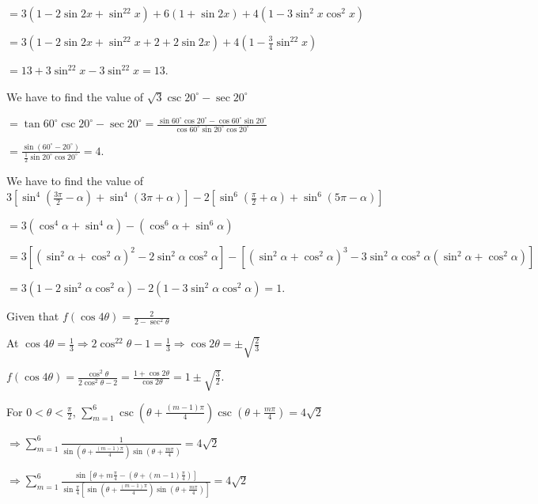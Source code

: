   $= 3\left(1 - 2\sin2x + \sin^22x\right) + 6(1 + \sin2x) + 4\left(1 -
  3\sin^2x\cos^2x\right)$

  $= 3\left(1 - 2\sin2x + \sin^22x + 2 + 2\sin2x\right) + 4\left(1 - \frac{3}{4}\sin^22x\right)$

  $= 13 + 3\sin^22x - 3\sin^22x = 13$.
\item We have to find the value of $\sqrt{3}\csc20^\circ - \sec20^\circ$

  $= \tan60^\circ\csc20^\circ - \sec20^\circ = \frac{\sin60^\circ\cos20^\circ
  - \cos60^\circ\sin20^\circ}{\cos60^\circ\sin20^\circ\cos20^\circ}$

  $= \frac{\sin\left(60^\circ - 20^\circ\right)}{\frac{1}{2}\sin20^\circ\cos20^\circ} = 4$.
\item We have to find the value of $3\left[\sin^4\left(\frac{3\pi}{2} - \alpha\right) + \sin^4(3\pi
  + \alpha)\right] - 2\left[\sin^6\left(\frac{\pi}{2} + \alpha\right) + \sin^6(5\pi - \alpha)\right]$

  $= 3\left(\cos^4\alpha + \sin^4\alpha\right) - \left(\cos^6\alpha + \sin^6\alpha\right)$

  $= 3\left[\left(\sin^2\alpha + \cos^2\alpha\right)^2 - 2\sin^2\alpha\cos^2\alpha\right]
  - \left[\left(\sin^2\alpha + \cos^2\alpha\right)^3 - 3\sin^2\alpha\cos^2\alpha\left(\sin^2\alpha
    + \cos^2\alpha\right)\right]$

  $= 3\left(1 - 2\sin^2\alpha\cos^2\alpha\right) - 2\left(1 - 3\sin^2\alpha\cos^2\alpha\right) = 1$.
\item Given that $f(\cos4\theta) = \frac{2}{2 - \sec^2\theta}$

  At $\cos4\theta = \frac{1}{3} \Rightarrow 2\cos^22\theta - 1 = \frac{1}{3}\Rightarrow \cos2\theta
  = \pm\sqrt{\frac{2}{3}}$

  $f(\cos4\theta) = \frac{\cos^2\theta}{2\cos^2\theta - 2} = \frac{1 + \cos2\theta}{\cos2\theta} =
  1\pm\sqrt{\frac{3}{2}}$.
\item For $0 < \theta < \frac{\pi}{2}$, $\displaystyle\sum_{m =
  1}^6\csc\left(\theta + \frac{(m - 1)\pi}{4}\right)\csc\left(\theta + \frac{m\pi}{4}\right) =
  4\sqrt{2}$

  $\Rightarrow \displaystyle\sum_{m = 1}^6\frac{1}{\sin\left(\theta + \frac{(m -
        1)\pi}{4}\right)\sin\left(\theta + \frac{m\pi}{4}\right)} = 4\sqrt{2}$

  $\Rightarrow \displaystyle\sum_{m = 1}^6\frac{\sin\left[\theta + m\frac{\pi}{4} - \left(\theta + (m -
      1)\frac{\pi}{4}\right)\right]}{\sin\frac{\pi}{4}\left[\sin\left(\theta + \frac{(m -
          1)\pi}{4}\right)\sin\left(\theta + \frac{m\pi}{4}\right)\right]} = 4\sqrt{2}$


